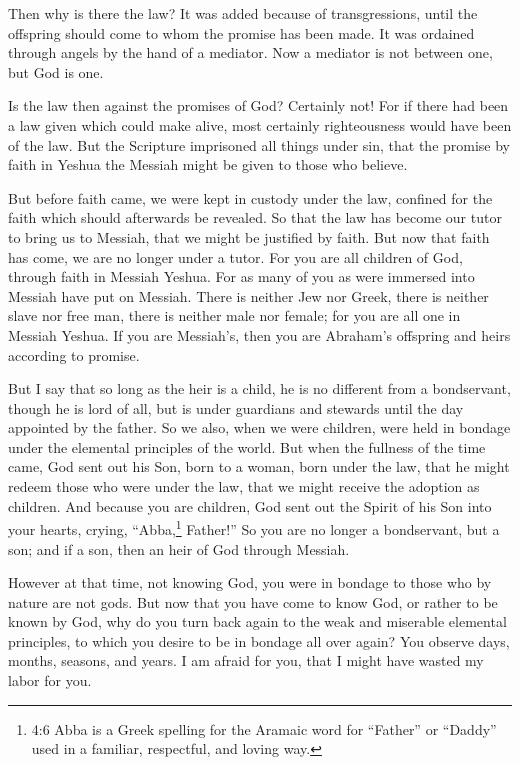 \myverse{}Then why is there the law? It was added because of transgressions,
until the offspring should come to whom the promise has been made. It was ordained through angels by the
hand of a mediator.
\myverse{}Now a mediator is not between one, but God is one.

\myverse{}Is the law then against the promises of God? Certainly not! For
if there had been a law given which could make alive, most certainly righteousness would have been of
the law.
\myverse{}But the Scripture imprisoned all things under sin, that the promise by faith
in Yeshua the Messiah might be given to those who believe.

\myverse{}But before faith came, we were kept in custody under the law,
confined for the faith which should afterwards be revealed.
\myverse{}So that the law has become our tutor to bring us to Messiah, that we might
be justified by faith.
\myverse{}But now that faith has come, we are no longer under a tutor.
\myverse{}For you are all children of God, through faith in Messiah Yeshua.
\myverse{}For as many of you as were immersed into Messiah have put on Messiah.
\myverse{}There is neither Jew nor Greek, there is neither slave nor free man, there
is neither male nor female; for you are all one in Messiah Yeshua.
\myverse{}If you are Messiah’s, then you are Abraham’s offspring and heirs according
to promise.


\mychapter{} \myverse*{}But I say that so long as the heir is a child, he is no different
from a bondservant, though he is lord of all,
\myverse{}but is under guardians and stewards until the day appointed by the father.
\myverse{}So we also, when we were children, were held in bondage under the elemental
principles of the world.
\myverse{}But when the fullness of the time came, God sent out his Son, born to a woman,
born under the law,
\myverse{}that he might redeem those who were under the law, that we might receive the
adoption as children.
\myverse{}And because you are children, God sent out the Spirit of his Son into your hearts,
crying, “Abba,\footnote{4:6 Abba is a Greek spelling for the Aramaic word for “Father” or “Daddy” used in a familiar, respectful,
	and loving way.
} Father!”
\myverse{}So you are no longer a bondservant, but a son; and if a son, then an heir of
God through Messiah.

\myverse{}However at that time, not knowing God, you were in bondage to those
who by nature are not gods.
\myverse{}But now that you have come to know God, or rather to be known by God, why do
you turn back again to the weak and miserable elemental principles, to which you desire to be in bondage
all over again?
\myverse{}You observe days, months, seasons, and years.
\myverse{}I am afraid for you, that I might have wasted my labor for you.

